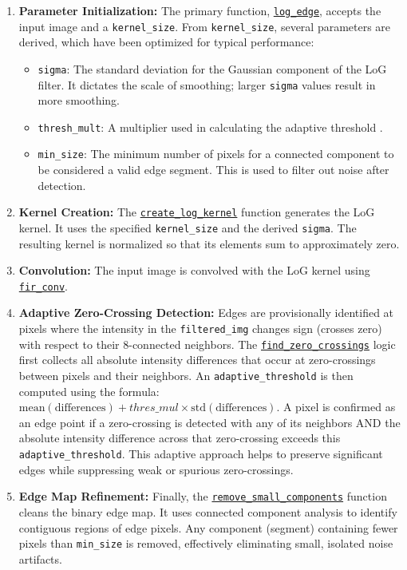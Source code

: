 \documentclass[12pt,a4paper]{article}
\begin{document}
\begin{enumerate}
    \item \textbf{Parameter Initialization:}
    The primary function, \href{Code/log_edge.py}{\texttt{log\_edge}}, accepts the input image and a \texttt{kernel\_size}. From \texttt{kernel\_size}, several parameters are derived, which have been optimized for typical performance:
    \begin{itemize}
        \item \texttt{sigma}: The standard deviation for the Gaussian component of the LoG filter. It dictates the scale of smoothing; larger \texttt{sigma} values result in more smoothing.
        \item \texttt{thresh\_mult}: A multiplier used in calculating the adaptive threshold .
        \item \texttt{min\_size}: The minimum number of pixels for a connected component to be considered a valid edge segment. This is used to filter out noise after detection.
    \end{itemize}
    
    \item \textbf{Kernel Creation:}
    The \href{Code/log_edge.py}{\texttt{create\_log\_kernel}} function generates the LoG kernel. It uses the specified \texttt{kernel\_size} and the derived \texttt{sigma}. The resulting kernel is normalized so that its elements sum to approximately zero.

    \item \textbf{Convolution:} The input image is convolved with the LoG kernel using \href{Code/fir_conv.py}{\texttt{fir\_conv}}.

    \item \textbf{Adaptive Zero-Crossing Detection:}
    Edges are provisionally identified at pixels where the intensity in the \texttt{filtered\_img} changes sign (crosses zero) with respect to their 8-connected neighbors. The \href{Code/log_edge.py}{\texttt{find\_zero\_crossings}} logic first collects all absolute intensity differences that occur at zero-crossings between pixels and their neighbors. An \texttt{adaptive\_threshold} is then computed using the formula: $\text{mean}(\text{differences}) + thres\_mul \times \text{std}(\text{differences})$. A pixel is confirmed as an edge point if a zero-crossing is detected with any of its neighbors AND the absolute intensity difference across that zero-crossing exceeds this \texttt{adaptive\_threshold}. This adaptive approach helps to preserve significant edges while suppressing weak or spurious zero-crossings.

    
    \item \textbf{Edge Map Refinement:}
    Finally, the \href{Code/log_edge.py}{\texttt{remove\_small\_components}} function cleans the binary edge map. It uses connected component analysis to identify contiguous regions of edge pixels. Any component (segment) containing fewer pixels than \texttt{min\_size} is removed, effectively eliminating small, isolated noise artifacts.
\end{enumerate}
\end{document}
